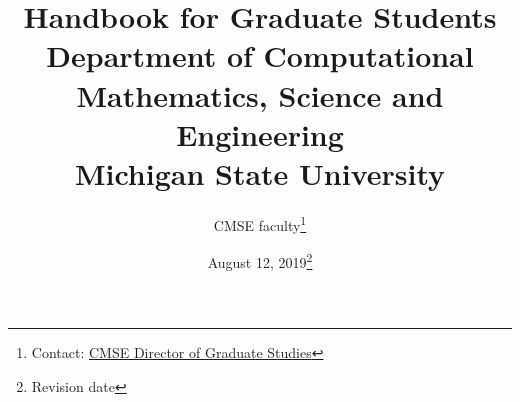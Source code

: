 \documentclass[12pt]{article}
\begin{document}
\vspace{-50mm}
\title{Handbook for Graduate Students\\
\vspace{20mm}
  \large Department of Computational Mathematics, Science and
  Engineering\\
\vspace{20mm}
Michigan State University
\vspace{50mm}
}

\author{CMSE faculty\footnote{Contact:
    \href{mailto:cmsegrad@msu.edu}{CMSE Director of Graduate Studies}
  }}

\date{August 12, 2019\footnote{Revision date}}

\maketitle

\newpage

\tableofcontents

\newpage



\newpage



\newpage



\newpage



\newpage



\newpage



\newpage



\newpage



\newpage



\newpage



\newpage



\newpage



\newpage



\newpage



\newpage

\appendix



\newpage



\newpage


\end{document}
